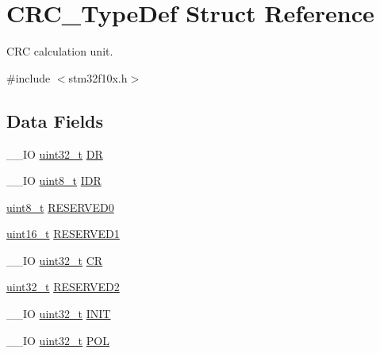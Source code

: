 \hypertarget{struct_c_r_c___type_def}{\section{C\-R\-C\-\_\-\-Type\-Def Struct Reference}
\label{struct_c_r_c___type_def}
}


C\-R\-C calculation unit.  




{\ttfamily \#include $<$stm32f10x.\-h$>$}

\subsection*{Data Fields}
\begin{DoxyCompactItemize}
\item 
\-\_\-\-\_\-\-I\-O \hyperlink{stdint_8h_a435d1572bf3f880d55459d9805097f62}{uint32\-\_\-t} \hyperlink{struct_c_r_c___type_def_a50cb22870dbb9001241cec694994e5ef}{D\-R}
\item 
\-\_\-\-\_\-\-I\-O \hyperlink{stdint_8h_aba7bc1797add20fe3efdf37ced1182c5}{uint8\-\_\-t} \hyperlink{struct_c_r_c___type_def_ad84e8694cd4b5375ee533c2d875c3b5a}{I\-D\-R}
\item 
\hyperlink{stdint_8h_aba7bc1797add20fe3efdf37ced1182c5}{uint8\-\_\-t} \hyperlink{struct_c_r_c___type_def_a70dfd1730dba65041550ef55a44db87c}{R\-E\-S\-E\-R\-V\-E\-D0}
\item 
\hyperlink{stdint_8h_a273cf69d639a59973b6019625df33e30}{uint16\-\_\-t} \hyperlink{struct_c_r_c___type_def_a8b205c6e25b1808ac016db2356b3021d}{R\-E\-S\-E\-R\-V\-E\-D1}
\item 
\-\_\-\-\_\-\-I\-O \hyperlink{stdint_8h_a435d1572bf3f880d55459d9805097f62}{uint32\-\_\-t} \hyperlink{struct_c_r_c___type_def_af33fa5c173e1c102e6d0242fe60e569f}{C\-R}
\item 
\hyperlink{stdint_8h_a435d1572bf3f880d55459d9805097f62}{uint32\-\_\-t} \hyperlink{struct_c_r_c___type_def_a4dd260a7d589d62975619a42f9a6abe4}{R\-E\-S\-E\-R\-V\-E\-D2}
\item 
\-\_\-\-\_\-\-I\-O \hyperlink{stdint_8h_a435d1572bf3f880d55459d9805097f62}{uint32\-\_\-t} \hyperlink{struct_c_r_c___type_def_a13639f272f5093e184d726ed5a8945a3}{I\-N\-I\-T}
\item 
\-\_\-\-\_\-\-I\-O \hyperlink{stdint_8h_a435d1572bf3f880d55459d9805097f62}{uint32\-\_\-t} \hyperlink{struct_c_r_c___type_def_a0a6a8675609cee77ff162e575cfc74e8}{P\-O\-L}
\end{DoxyCompactItemize}


